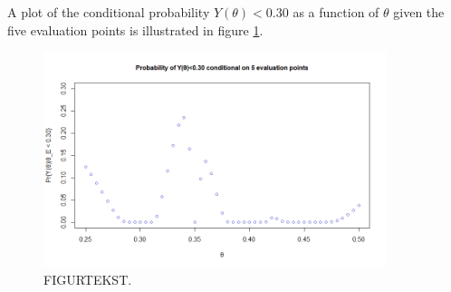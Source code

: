 A plot of the conditional probability $Y(\theta)<0.30$ as a function of $\theta$ given the five evaluation points is illustrated in figure \ref{2b}. 


\begin{figure}
    \centering
    \includegraphics[width=100mm]{2bPlot.png}
    \caption{ FIGURTEKST. }
    \label{2b}
\end{figure}